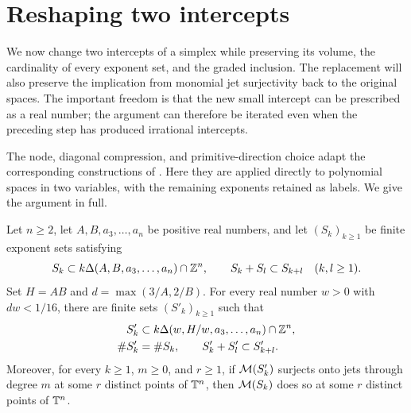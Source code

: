 \section{Reshaping two intercepts}\label{sec:reshaping}

We now change two intercepts of a simplex while preserving its volume, the
cardinality of every exponent set, and the graded inclusion.  The replacement
will also preserve the implication from monomial jet surjectivity back to the
original spaces.  The important freedom is that the new small intercept can
be prescribed as a real number; the argument can therefore be iterated even
when the preceding step has produced irrational intercepts.

The node, diagonal compression, and primitive-direction choice adapt the
corresponding constructions of
\citet[Propositions~3.2 and~3.4 and Lemma~4.3]{OpenAI2026Surfaces}.
Here they are applied directly to polynomial spaces in two variables, with
the remaining exponents retained as labels.  We give the argument in full.

\begin{proposition}\label{prop:reshape}
Let $n\ge2$, let $A,B,a_3,\ldots,a_n$ be positive real numbers, and let
$(S_k)_{k\ge1}$ be finite exponent sets satisfying
\[
 S_k\subset k\Delta(A,B,a_3,\ldots,a_n)\cap\mathbb Z^n,
 \qquad S_k+S_l\subset S_{k+l}\quad(k,l\ge1).
\]
Set $H=AB$ and $d=\max(3/A,2/B)$.  For every real number $w>0$ with
$dw<1/16$, there are finite sets $(S'_k)_{k\ge1}$ such that
\begin{align}
 S'_k&\subset k\Delta(w,H/w,a_3,\ldots,a_n)\cap\mathbb Z^n,
                                                        \label{eq:reshape-bound}\\
 \#S'_k&=\#S_k,
 \qquad S'_k+S'_l\subset S'_{k+l}.                       \label{eq:reshape-graded}
\end{align}
Moreover, for every $k\ge1$, $m\ge0$, and $r\ge1$, if $\mathcal M(S'_k)$ surjects
onto jets through degree $m$ at some $r$ distinct points of $\mathbb T^n$,
then $\mathcal M(S_k)$ does so at some $r$ distinct points of $\mathbb T^n$.
\end{proposition}



